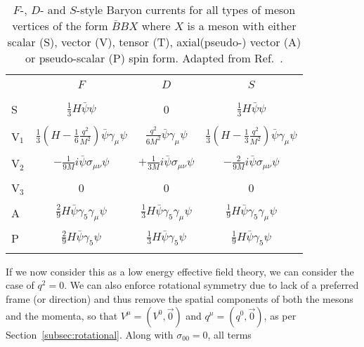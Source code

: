 \documentclass[11pt,a4paper,twoside]{carrollthesis}
\newcommand{\reci}[1]{\frac{1}{#1}}
\begin{document}
\begin{table}[!t]
\centering
\caption[$F$-, $D$- and $S$-style baryon currents]{\protect $F$-, $D$-
  and $S$-style Baryon currents for all types of meson vertices of the
  form $\bar{B}BX$ where $X$ is a meson with either scalar (S), vector
  (V), tensor (T), axial(pseudo-) vector (A) or pseudo-scalar (P) spin
  form. Adapted from Ref.~\cite{Sakita:1965qt}.\label{tab:currents}}
\vspace{3mm}
\begin{tabular}{lccc}
\hline 
\hline 
&&&\\[-4mm]
   &     $F$    &    $D$    &    $S$ \\
&&&\\[-4mm]
\hline
&&&\\[-2mm]
S  & $\reci{3}H\bar{\psi}\psi$ & 0 & $\reci{3}H\bar{\psi}\psi$ \\
&&&\\[-2mm]
V${}_1$ & $\reci{3}\left(H-\reci{6}\frac{q^2}{M^2}\right)\bar{\psi}\gamma_\mu\psi$ &
 $\frac{q^2}{6M^2}\bar{\psi}\gamma_\mu\psi$ &
 $\reci{3}\left(H-\reci{3}\frac{q^2}{M^2}\right)\bar{\psi}\gamma_\mu\psi$ \\
&&&\\[-2mm]
V${}_2$ & $-\reci{9M}i\bar{\psi}\sigma_{\mu\nu}\psi$ &  
$ + \reci{3M}i\bar{\psi}\sigma_{\mu\nu}\psi$ &
$ - \frac{2}{9M}i\bar{\psi}\sigma_{\mu\nu}\psi$ \\
&&&\\[-2mm]
V${}_3$ &  0  &  0  &  0  \\
&&&\\[-2mm]
A & $ \frac{2}{9}H\bar{\psi}\gamma_5\gamma_\mu\psi $ &
    $ \reci{3}H\bar{\psi}\gamma_5\gamma_\mu\psi $    & 
    $ \reci{9}H\bar{\psi}\gamma_5\gamma_\mu\psi $ \\
&&&\\[-2mm]
P & $ \frac{2}{9}H\bar{\psi}\gamma_5\psi $ &
    $ \reci{3}H\bar{\psi}\gamma_5\psi $    & 
    $ \reci{9}H\bar{\psi}\gamma_5\psi $ \\
&&&\\[-2mm]
\hline
\hline
\end{tabular}
\end{table}
%
If we now consider this as a low energy effective field theory, we can
consider the case of $q^2=0$. We can also enforce rotational symmetry
due to lack of a preferred frame (or direction) and thus remove the
spatial components of both the mesons and the momenta, so that
$V^\mu=(V^0,\vec{0})$ and $q^\mu=(q^0,\vec{0})$, as per
Section~\ref{subsec:rotational}. Along with $\sigma_{00}=0$, all terms
\end{document}
